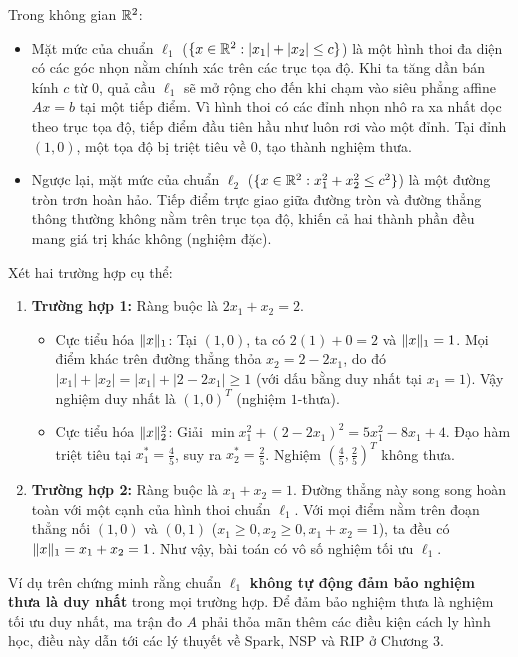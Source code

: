 Trong không gian $\mathbb{R}^2$:
\begin{itemize}
    \item Mặt mức của chuẩn $\ell_1$ ($\{x \in \mathbb{R}^2 : |x_1| + |x_2| \le c\}$) là một hình thoi đa diện có các góc nhọn nằm chính xác trên các trục tọa độ. Khi ta tăng dần bán kính $c$ từ 0, quả cầu $\ell_1$ sẽ mở rộng cho đến khi chạm vào siêu phẳng affine $Ax = b$ tại một tiếp điểm. Vì hình thoi có các đỉnh nhọn nhô ra xa nhất dọc theo trục tọa độ, tiếp điểm đầu tiên hầu như luôn rơi vào một đỉnh. Tại đỉnh $(1, 0)$, một tọa độ bị triệt tiêu về 0, tạo thành nghiệm thưa.
    \item Ngược lại, mặt mức của chuẩn $\ell_2$ ($\{x \in \mathbb{R}^2 : x_1^2 + x_2^2 \le c^2\}$) là một đường tròn trơn hoàn hảo. Tiếp điểm trực giao giữa đường tròn và đường thẳng thông thường không nằm trên trục tọa độ, khiến cả hai thành phần đều mang giá trị khác không (nghiệm đặc).
\end{itemize}

\begin{example}
Xét hai trường hợp cụ thể:
\begin{enumerate}
    \item \textbf{Trường hợp 1:} Ràng buộc là $2x_1 + x_2 = 2$.
    \begin{itemize}
        \item Cực tiểu hóa $\|x\|_1$: Tại $(1, 0)$, ta có $2(1) + 0 = 2$ và $\|x\|_1 = 1$. Mọi điểm khác trên đường thẳng thỏa $x_2 = 2 - 2x_1$, do đó $|x_1| + |x_2| = |x_1| + |2 - 2x_1| \ge 1$ (với dấu bằng duy nhất tại $x_1 = 1$). Vậy nghiệm duy nhất là $(1, 0)^T$ (nghiệm $1$-thưa).
        \item Cực tiểu hóa $\|x\|_2^2$: Giải $\min x_1^2 + (2 - 2x_1)^2 = 5x_1^2 - 8x_1 + 4$. Đạo hàm triệt tiêu tại $x_1^* = \frac{4}{5}$, suy ra $x_2^* = \frac{2}{5}$. Nghiệm $\left(\frac{4}{5}, \frac{2}{5}\right)^T$ không thưa.
    \end{itemize}
    \item \textbf{Trường hợp 2:} Ràng buộc là $x_1 + x_2 = 1$.
    Đường thẳng này song song hoàn toàn với một cạnh của hình thoi chuẩn $\ell_1$. Với mọi điểm nằm trên đoạn thẳng nối $(1, 0)$ và $(0, 1)$ ($x_1 \ge 0, x_2 \ge 0, x_1 + x_2 = 1$), ta đều có $\|x\|_1 = x_1 + x_2 = 1$. Như vậy, bài toán có vô số nghiệm tối ưu $\ell_1$. 
\end{enumerate}
\end{example}

\begin{remark}
Ví dụ trên chứng minh rằng chuẩn $\ell_1$ \textbf{không tự động đảm bảo nghiệm thưa là duy nhất} trong mọi trường hợp. Để đảm bảo nghiệm thưa là nghiệm tối ưu duy nhất, ma trận đo $A$ phải thỏa mãn thêm các điều kiện cách ly hình học, điều này dẫn tới các lý thuyết về Spark, NSP và RIP ở Chương 3.
\end{remark}

